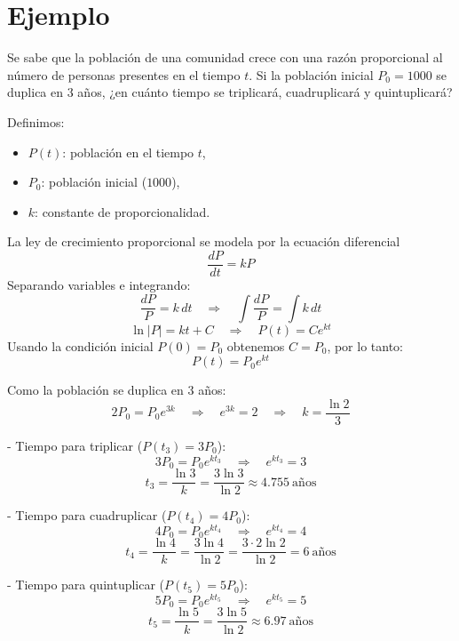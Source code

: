\documentclass{article}
\begin{document}
\section*{Ejemplo}
Se sabe que la población de una comunidad crece con una razón proporcional al número de personas presentes en el tiempo $t$. Si la población inicial $P_0 = 1000$ se duplica en $3$ años, ¿en cuánto tiempo se triplicará, cuadruplicará y quintuplicará?

Definimos:
\begin{itemize}
  \item $P(t)$: población en el tiempo $t$,
  \item $P_0$: población inicial ($1000$),
  \item $k$: constante de proporcionalidad.
\end{itemize}

La ley de crecimiento proporcional se modela por la ecuación diferencial
\[
\frac{dP}{dt}=kP
\]
Separando variables e integrando:
\[
\frac{dP}{P}=k\,dt \quad\Rightarrow\quad \int\frac{dP}{P}=\int k\,dt
\]
\[
\ln|P|=kt+C \quad\Rightarrow\quad P(t)=Ce^{kt}
\]
Usando la condición inicial $P(0)=P_0$ obtenemos $C=P_0$, por lo tanto:
\[
P(t)=P_0 e^{kt}
\]

Como la población se duplica en $3$ años:
\[
2P_0 = P_0 e^{3k} \quad\Rightarrow\quad e^{3k}=2 \quad\Rightarrow\quad k=\frac{\ln 2}{3}
\]

- Tiempo para triplicar ($P(t_3)=3P_0$):
\[
3P_0 = P_0 e^{k t_3} \quad\Rightarrow\quad e^{k t_3}=3
\]
\[
t_3=\frac{\ln 3}{k}=\frac{3\ln 3}{\ln 2}\approx 4.755\ \text{años}
\]

- Tiempo para cuadruplicar ($P(t_4)=4P_0$):
\[
4P_0 = P_0 e^{k t_4} \quad\Rightarrow\quad e^{k t_4}=4
\]
\[
t_4=\frac{\ln 4}{k}=\frac{3\ln 4}{\ln 2}=\frac{3\cdot 2\ln 2}{\ln 2}=6\ \text{años}
\]

- Tiempo para quintuplicar ($P(t_5)=5P_0$):
\[
5P_0 = P_0 e^{k t_5} \quad\Rightarrow\quad e^{k t_5}=5
\]
\[
t_5=\frac{\ln 5}{k}=\frac{3\ln 5}{\ln 2}\approx 6.97\ \text{años}
\]
\end{document}
